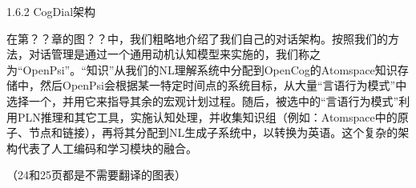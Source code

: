 1.6.2 CogDial架构

在第？？章的图？？中，我们粗略地介绍了我们自己的对话架构。按照我们的方法，对话管理是通过一个通用动机认知模型来实施的，我们称之为“OpenPsi”。“知识”从我们的NL理解系统中分配到OpenCog的Atomspace知识存储中，然后OpenPsi会根据某一特定时间点的系统目标，从大量“言语行为模式”中选择一个，并用它来指导其余的宏观计划过程。随后，被选中的“言语行为模式”利用PLN推理和其它工具，实施认知处理，并收集知识组（例如：Atomspace中的原子、节点和链接），再将其分配到NL生成子系统中，以转换为英语。这个复杂的架构代表了人工编码和学习模块的融合。
 
（24和25页都是不需要翻译的图表）
